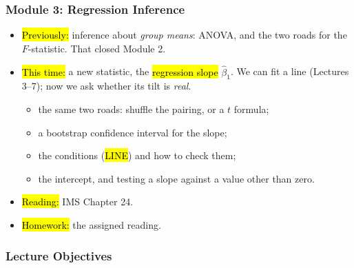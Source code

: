 

\begin{frame}
\frametitle{Module 3: Regression Inference}
    \begin{itemize}
        \item \hl{Previously:} inference about \emph{group means}: ANOVA, and the two roads for the $F$-statistic. That closed Module 2.
        \item \hl{This time:} a new statistic, the \hl{regression slope} $\hat\beta_1$. We can fit a line (Lectures 3--7); now we ask whether its tilt is \emph{real}.
          \begin{itemize}
              \item the same two roads: shuffle the pairing, or a $t$ formula;
              \item a bootstrap confidence interval for the slope;
              \item the conditions (\hl{LINE}) and how to check them;
              \item the intercept, and testing a slope against a value other than zero.
          \end{itemize}
        \item \hl{Reading:} IMS Chapter 24.
        \item \hl{Homework:} the assigned reading.
    \end{itemize}
\end{frame}


\begin{frame}
    \frametitle{Lecture Objectives}
\end{frame}
